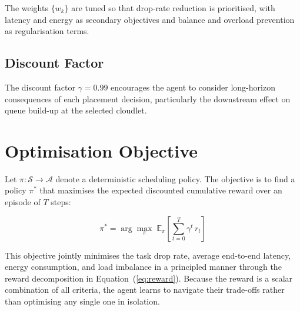 The weights $\{w_k\}$ are tuned so that drop-rate reduction is
prioritised, with latency and energy as secondary objectives and
balance and overload prevention as regularisation terms.

\subsection{Discount Factor}

The discount factor $\gamma = 0.99$ encourages the agent to
consider long-horizon consequences of each placement decision,
particularly the downstream effect on queue build-up at the
selected cloudlet.

\section{Optimisation Objective}
\label{sec:objective}

Let $\pi : \mathcal{S} \rightarrow \mathcal{A}$ denote a
deterministic scheduling policy. The objective is to find a
policy $\pi^*$ that maximises the expected discounted cumulative
reward over an episode of $T$ steps:

\begin{equation}
\pi^* = \arg\max_{\pi} \;
\mathbb{E}_{\pi} \!\left[
  \sum_{t=0}^{T} \gamma^t \, r_t
\right]
\label{eq:objective}
\end{equation}

This objective jointly minimises the task drop rate, average
end-to-end latency, energy consumption, and load imbalance in a
principled manner through the reward decomposition in
Equation~(\ref{eq:reward}). Because the reward is a scalar
combination of all criteria, the agent learns to navigate their
trade-offs rather than optimising any single one in isolation.
